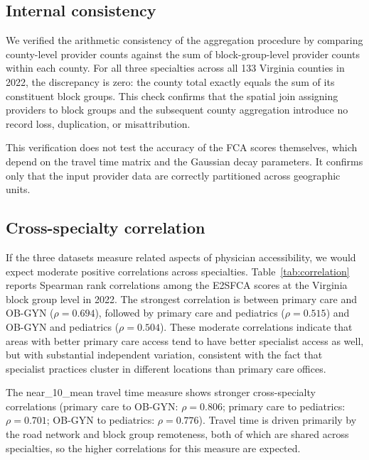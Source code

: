 \documentclass{CUP-JNL-DAP}%
\begin{document}
\subsection{Internal consistency}

We verified the arithmetic consistency of the aggregation procedure by comparing county-level provider counts against the sum of block-group-level provider counts within each county. For all three specialties across all 133 Virginia counties in 2022, the discrepancy is zero: the county total exactly equals the sum of its constituent block groups. This check confirms that the spatial join assigning providers to block groups and the subsequent county aggregation introduce no record loss, duplication, or misattribution.

This verification does not test the accuracy of the FCA scores themselves, which depend on the travel time matrix and the Gaussian decay parameters. It confirms only that the input provider data are correctly partitioned across geographic units.

\subsection{Cross-specialty correlation}

If the three datasets measure related aspects of physician accessibility, we would expect moderate positive correlations across specialties. Table~\ref{tab:correlation} reports Spearman rank correlations among the E2SFCA scores at the Virginia block group level in 2022. The strongest correlation is between primary care and OB-GYN ($\rho = 0.694$), followed by primary care and pediatrics ($\rho = 0.515$) and OB-GYN and pediatrics ($\rho = 0.504$). These moderate correlations indicate that areas with better primary care access tend to have better specialist access as well, but with substantial independent variation, consistent with the fact that specialist practices cluster in different locations than primary care offices.

The near\_10\_mean travel time measure shows stronger cross-specialty correlations (primary care to OB-GYN: $\rho = 0.806$; primary care to pediatrics: $\rho = 0.701$; OB-GYN to pediatrics: $\rho = 0.776$). Travel time is driven primarily by the road network and block group remoteness, both of which are shared across specialties, so the higher correlations for this measure are expected.
\end{document}
